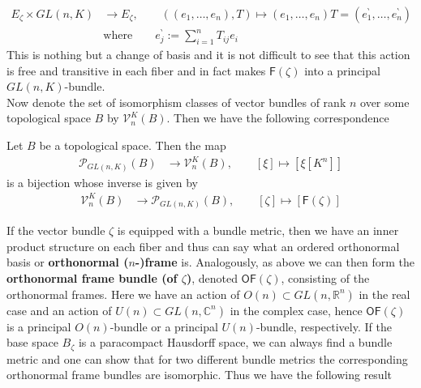\begin{align*}
  E_{\mathsf{\zeta}}
  \times
  GL(n,K)
  &\to
  E_{\mathsf{\zeta}}
  ,\qquad
  \left(
    (e_{1},\ldots,e_{n})
    ,
    T
  \right)
  \mapsto
  (e_{1},\ldots,e_{n})
  T
  =
  \left(
    e_{1}^{\backprime}
    ,
    \ldots
    ,
    e_{n}^{\backprime}
  \right)
  \\
  &
  \text{where}
  \qquad
  e_{j}^{\backprime}
  :=
  \sum_{i=1}^{n}
  T_{ij}
  e_{i}
\end{align*}
This is nothing but a change of basis and it is not difficult to see that this action is free and transitive in each fiber and in fact makes $\mathsf{F}(\zeta)$ into a principal $GL(n,K)$-bundle.
\\
Now denote the set of isomorphism classes of vector bundles of rank $n$ over some topological space $B$ by $\mathcal{V}_{n}^{K}(B)$. Then we have the following correspondence
\\
\begin{thm}
\label{thm:prvecbund}
Let $B$ be a topological space. Then the map
\begin{align*}
  \mathcal{P}_{GL(n,K)}(B)
  &\to
  \mathcal{V}_{n}^{K}(B)
  ,\qquad
  [\xi]
  \mapsto
  [\xi[K^{n}]]
\end{align*}
is a bijection whose inverse is given by
\begin{align*}
  \mathcal{V}_{n}^{K}(B)
  &\to
  \mathcal{P}_{GL(n,K)}(B)
  ,\qquad
  [\zeta]
  \mapsto
  [\mathsf{F}(\zeta)]
\end{align*}
\end{thm}
If the vector bundle $\zeta$ is equipped with a bundle metric, then we have an inner product structure on each fiber and thus can say what an ordered orthonormal basis or \textbf{orthonormal ($n$-)frame} is. Analogously, as above we can then form the \textbf{orthonormal frame bundle (of $\zeta$)}, denoted $\mathsf{OF}(\zeta)$, consisting of the orthonormal frames. Here we have an action of $O(n) \subset GL(n,\mathbb{R}^{n})$ in the real case and an action of $U(n) \subset GL(n,\mathbb{C}^{n})$ in the complex case, hence $\mathsf{OF}(\zeta)$ is a principal $O(n)$-bundle or a principal $U(n)$-bundle, respectively. If the base space $B_{\zeta}$ is a paracompact Hausdorff space, we can always find a bundle metric and one can show that for two different bundle metrics the corresponding orthonormal frame bundles are isomorphic. Thus we have the following result
\\
